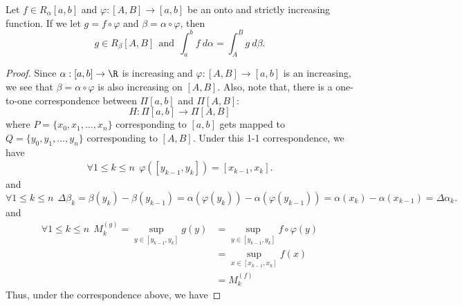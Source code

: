 \begin{theorem}
    Let \( f \in {R}_{\alpha}[a,b]  \) and \( \varphi : [A,B] \to [a,b] \) be an onto and strictly increasing function. If we let \( g = f \circ \varphi  \) and \( \beta = \alpha \circ \varphi  \), then
    \[  g \in {R}_{\beta}[A,B] \ \ \text{and} \ \ \int_{ a }^{ b }  f  \ d \alpha = \int_{ A  }^{  B  }  g  \ d \beta. \]
\end{theorem}
\begin{proof}
    Since \( \alpha:[a,b] \to \R  \) is increasing and \( \varphi : [A,B] \to [a,b]  \) is an increasing, we see that 
    \(  \beta = \alpha \circ \varphi  \)
    is also increasing on \( [A,B] \). Also, note that, there is a one-to-one correspondence between \( \Pi [a,b] \) and \( \Pi [A,B] \):
    \[  H: \Pi [a,b] \to \Pi [A,B] \]
    where \( P = \{ {x}_{0}, {x}_{1}, \dots, {x}_{n} \}  \) corresponding to \( [a,b] \) gets mapped to \( Q = \{ {y}_{0}, {y}_{1}, \dots, {y}_{n} \}  \) corresponding to \( [A,B] \). Under this 1-1 correspondence, we have
    \begin{align*}
        \forall 1 \leq k \leq n \ \ \varphi([{y}_{k-1}, {y}_{k}]) = [{x}_{k-1}, {x}_{k}].
    \end{align*}
    and
    \[  \forall 1 \leq k \leq n \ \ \Delta {\beta}_{k } = \beta({y}_{k}) - \beta({y}_{k-1}) = \alpha(\varphi({y}_{k})) - \alpha(\varphi({y}_{k-1})) = \alpha({x}_{k}) - \alpha({x}_{k-1}) = \Delta {\alpha}_{k }. \]
    and
    \begin{align*}
        \forall 1 \leq k \leq n  \ \ {M}_{k }^{(g)} = \sup_{y \in [{y}_{k-1}, {y}_{k}]} g(y) &= \sup_{y \in [{y}_{k-1}, {y}_{k}]} f \circ \varphi (y) \\
                                                                                             &= \sup_{x \in [{x}_{k-1}, {x}_{k}]} f(x) \\
                                                                                             &= {M}_{k}^{(f)}
    \end{align*}
    Thus, under the correspondence above, we have 
\end{proof}


